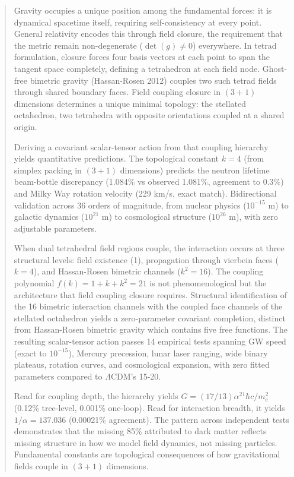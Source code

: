 \documentclass[aps,prd,preprint,superscriptaddress,showpacs,preprintnumbers,amsmath,amssymb,nofootinbib]{revtex4-2}
\begin{document}
\begin{abstract}
Gravity occupies a unique position among the fundamental forces: it is dynamical spacetime itself, requiring self-consistency at every point. General relativity encodes this through field closure, the requirement that the metric remain non-degenerate ($\det(g) \neq 0$) everywhere. In tetrad formulation, closure forces four basis vectors at each point to span the tangent space completely, defining a tetrahedron at each field node. Ghost-free bimetric gravity (Hassan-Rosen 2012) couples two such tetrad fields through shared boundary faces. Field coupling closure in $(3{+}1)$ dimensions determines a unique minimal topology: the stellated octahedron, two tetrahedra with opposite orientations coupled at a shared origin.

Deriving a covariant scalar-tensor action from that coupling hierarchy yields quantitative predictions. The topological constant $k = 4$ (from simplex packing in $(3{+}1)$ dimensions) predicts the neutron lifetime beam-bottle discrepancy (1.084\% vs observed 1.081\%, agreement to 0.3\%) and Milky Way rotation velocity (229 km/s, exact match). Bidirectional validation across 36 orders of magnitude, from nuclear physics ($10^{-15}$ m) to galactic dynamics ($10^{21}$ m) to cosmological structure ($10^{26}$ m), with zero adjustable parameters.

When dual tetrahedral field regions couple, the interaction occurs at three structural levels: field existence (1), propagation through vierbein faces ($k = 4$), and Hassan-Rosen bimetric channels ($k^2 = 16$). The coupling polynomial $f(k) = 1 + k + k^2 = 21$ is not phenomenological but the architecture that field coupling closure requires. Structural identification of the 16 bimetric interaction channels with the coupled face channels of the stellated octahedron yields a zero-parameter covariant completion, distinct from Hassan-Rosen bimetric gravity which contains five free functions. The resulting scalar-tensor action passes 14 empirical tests spanning GW speed (exact to $10^{-15}$), Mercury precession, lunar laser ranging, wide binary plateaus, rotation curves, and cosmological expansion, with zero fitted parameters compared to $\Lambda$CDM's 15-20.

Read for coupling depth, the hierarchy yields $G = (17/13)\alpha^{21} \hbar c/m_e^2$ (0.12\% tree-level, 0.001\% one-loop). Read for interaction breadth, it yields $1/\alpha = 137.036$ (0.00021\% agreement). The pattern across independent tests demonstrates that the missing 85\% attributed to dark matter reflects missing structure in how we model field dynamics, not missing particles. Fundamental constants are topological consequences of how gravitational fields couple in $(3{+}1)$ dimensions.
\end{abstract}
\end{document}
